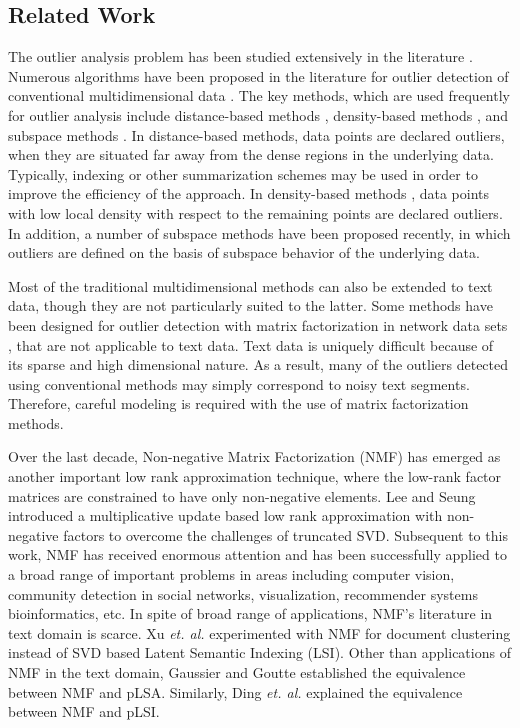 \subsection{Related Work} \label{sec:survey}

The outlier analysis problem has been studied extensively in the
literature \cite{outlierbook,chandola,hawkins}.  Numerous algorithms
have been proposed in the literature for outlier detection of
conventional multidimensional data \cite{hd,lof,knorr,rama}. The key
methods, which are used  frequently for outlier analysis include
distance-based methods \cite{knorr,rama}, density-based methods
\cite{lof}, and subspace methods \cite{hd,keller,laz,muller,zimek}.
In distance-based methods, data points are declared outliers, when
they are situated far away from  the dense regions in the underlying
data. Typically, indexing or other summarization schemes may be used
in order to improve the efficiency of the approach. In density-based
methods \cite{lof},   data points with low local density with
respect to the remaining points are declared outliers. In addition,
a number of subspace methods \cite{hd,keller,laz,muller,zimek} have
been proposed recently, in which outliers are defined on the basis
of subspace behavior of the underlying data.

Most of the traditional multidimensional
methods \cite{chandola,outlierbook} can also be extended to text
data, though they are not particularly suited to the latter. Some
methods have been designed for outlier detection with matrix
factorization in network data sets \cite{tong}, that
are not applicable to text data. Text data is uniquely
difficult because of its sparse and high dimensional nature.  As a
result, many of the outliers detected using conventional methods may
simply correspond to noisy text segments. Therefore, careful
modeling is required with the use of matrix factorization methods.

Over the last decade, Non-negative Matrix Factorization (NMF) has
emerged as another important low rank approximation technique, where
the low-rank factor matrices are constrained to have only
non-negative elements. Lee and Seung \cite{Lee1999} introduced a
multiplicative update based low rank approximation with non-negative
factors to overcome the challenges of truncated SVD. Subsequent to
this work, NMF has received enormous attention and has been
successfully applied to a broad range of important problems in areas
including computer vision, community detection in
social networks, visualization, recommender systems bioinformatics,
etc. In spite of broad range of applications,
NMF's literature in text domain is scarce. Xu {\em et. al.}
\cite{Xu2003} experimented with NMF for document clustering instead
of SVD based Latent Semantic Indexing (LSI). Other than applications
of NMF in the  text domain, Gaussier and Goutte \cite{Gaussier2005}
established the equivalence between NMF and pLSA. Similarly, Ding
{\em et. al.} \cite{Ding2006}  explained the equivalence between NMF
and pLSI.

